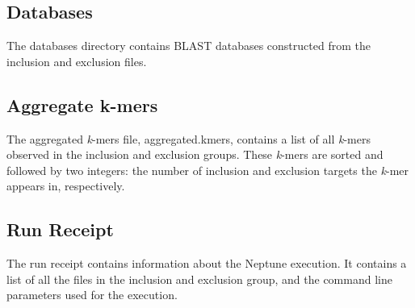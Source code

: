 \documentclass[a4paper,10pt]{article}
\begin{document}
\subsection{Databases}

The databases directory contains BLAST databases constructed from the inclusion and exclusion files.

\subsection{Aggregate k-mers}

The aggregated \textit{k}-mers file, aggregated.kmers, contains a list of all \textit{k}-mers observed in the inclusion and exclusion groups. These \textit{k}-mers are sorted and followed by two integers: the number of inclusion and exclusion targets the \textit{k}-mer appears in, respectively.

\subsection{Run Receipt}

The run receipt contains information about the Neptune execution. It contains a list of all the files in the inclusion and exclusion group, and the command line parameters used for the execution.
\end{document}
